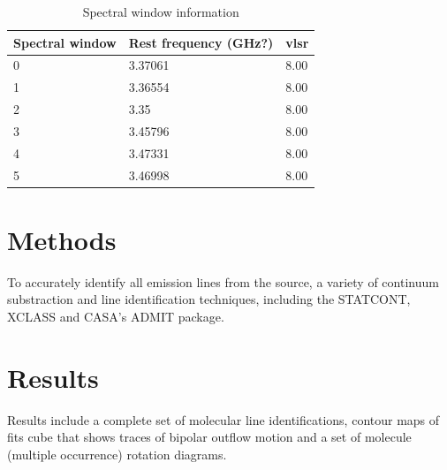 \documentclass{aa}
\begin{document}
   \begin{table}[htb]
        \label{table:0}  
        \caption{Spectral window information}
        \centering    
        \begin{tabular}{l l l} 
        \hline    
        Spectral window & Rest frequency (GHz?) & vlsr \\ 
        \hline   
        0 & 3.37061 & 8.00 \\
        1 & 3.36554 & 8.00 \\
        2 & 3.35 & 8.00 \\
        3 & 3.45796 & 8.00 \\
        4 & 3.47331 & 8.00 \\
        5 & 3.46998 & 8.00 \\
        \hline      
        \end{tabular}
    \end{table}
    
\section{Methods}
    To accurately identify all emission lines from the source, a variety of continuum substraction and line identification techniques, including the STATCONT, XCLASS and CASA's ADMIT package.

\section{Results}
    Results include a complete set of molecular line identifications, contour maps of fits cube that shows traces of bipolar outflow motion and a set of molecule (multiple occurrence) rotation diagrams.
\end{document}
